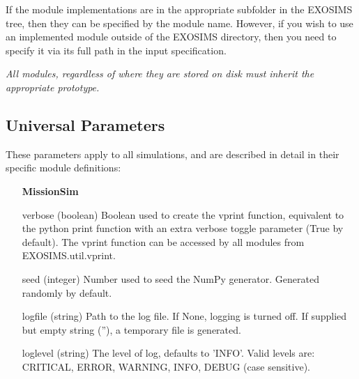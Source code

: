 \documentclass[cleanfoot]{asme2ej}
\begin{document}
If the module implementations are in the appropriate subfolder in the EXOSIMS tree, then they can be specified by the module name.  However, if you wish to use an implemented module outside of the EXOSIMS directory, then you need to specify it via its full path in the input specification.

\emph{All modules, regardless of where they are stored on disk must inherit the appropriate prototype.}

\subsection{Universal Parameters}
These parameters apply to all simulations, and are described in detail in their specific module definitions:

\begin{itemize}[leftmargin=1.5in,font={\ttfamily}]

\item[\textbf{MissionSim}]
\item[verbose] (boolean) Boolean used to create the vprint function, equivalent to the python print function with an extra verbose toggle parameter (True by default). The vprint function can be accessed by all modules from EXOSIMS.util.vprint.
\item[seed] (integer) Number used to seed the NumPy generator. Generated randomly by default.
\item[logfile] (string) Path to the log file. If None, logging is turned off. If supplied but empty string (''), a temporary file is generated.
\item[loglevel] (string) The level of log, defaults to 'INFO'. Valid levels are: CRITICAL, ERROR, WARNING, INFO, DEBUG (case sensitive).


\end{itemize}
\end{document}
